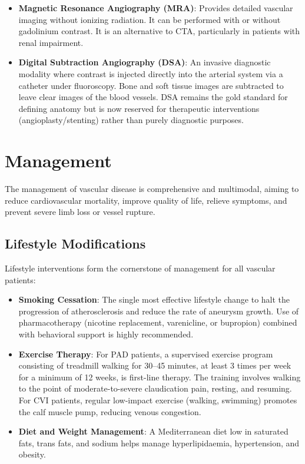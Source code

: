 \begin{itemize}
    \item \textbf{Magnetic Resonance Angiography (MRA)}: Provides detailed vascular imaging without ionizing radiation. It can be performed with or without gadolinium contrast. It is an alternative to CTA, particularly in patients with renal impairment.
    \item \textbf{Digital Subtraction Angiography (DSA)}: An invasive diagnostic modality where contrast is injected directly into the arterial system via a catheter under fluoroscopy. Bone and soft tissue images are subtracted to leave clear images of the blood vessels. DSA remains the gold standard for defining anatomy but is now reserved for therapeutic interventions (angioplasty/stenting) rather than purely diagnostic purposes.
\end{itemize}

\section*{Management}
The management of vascular disease is comprehensive and multimodal, aiming to reduce cardiovascular mortality, improve quality of life, relieve symptoms, and prevent severe limb loss or vessel rupture.

\subsection*{Lifestyle Modifications}
Lifestyle interventions form the cornerstone of management for all vascular patients:
\begin{itemize}
    \item \textbf{Smoking Cessation}: The single most effective lifestyle change to halt the progression of atherosclerosis and reduce the rate of aneurysm growth. Use of pharmacotherapy (nicotine replacement, varenicline, or bupropion) combined with behavioral support is highly recommended.
    \item \textbf{Exercise Therapy}: For PAD patients, a supervised exercise program consisting of treadmill walking for 30--45 minutes, at least 3 times per week for a minimum of 12 weeks, is first-line therapy. The training involves walking to the point of moderate-to-severe claudication pain, resting, and resuming. For CVI patients, regular low-impact exercise (walking, swimming) promotes the calf muscle pump, reducing venous congestion.
    \item \textbf{Diet and Weight Management}: A Mediterranean diet low in saturated fats, trans fats, and sodium helps manage hyperlipidaemia, hypertension, and obesity.
\end{itemize}


